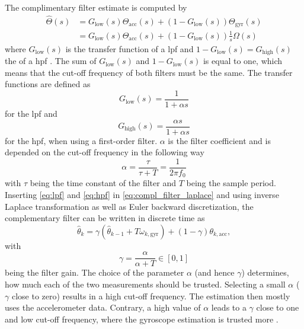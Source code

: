 The complimentary filter estimate is computed by
\begin{align}
	\label{eq:compl_filter_laplace}
	\hat{\Theta}(s) & = G_\mathrm{low}(s)\Theta_\mathrm{acc}(s) + (1 - G_\mathrm{low}(s))\Theta_\mathrm{gyr}(s) \nonumber \\
	                & = G_\mathrm{low}(s)\Theta_\mathrm{acc}(s) + (1 - G_\mathrm{low}(s))\frac{1}{s}\Omega (s)
\end{align}
where $G_\mathrm{low}(s)$ is the transfer function of a \gls{lpf} and $1-G_\mathrm{low}(s) = G_\mathrm{high}(s)$ the of a \gls{hpf} \cite{Kok2017}.
The sum of $G_\mathrm{low}(s)$ and $1-G_\mathrm{low}(s)$ is equal to one, which means that the cut-off frequency of both filters must be the same.
The transfer functions are defined as
\begin{equation}
	\label{eq:lpf}
	G_\mathrm{low} (s) = \frac{1}{1 + \alpha s}
\end{equation}
for the \gls{lpf} and
\begin{equation}
	\label{eq:hpf}
	G_\mathrm{high} (s) = \frac{\alpha s}{1 + \alpha s}
\end{equation}
for the \gls{hpf}, when using a first-order filter.
$\alpha$ is the filter coefficient and is depended on the cut-off frequency in the following way
\begin{equation}
	\alpha
	= \frac{\tau}{\tau + T}
	= \frac{1}{2\pi f_0}
	\label{eq:filter_f0}
\end{equation}
with $\tau$ being the time constant of the filter and $T$ being the sample period.
Inserting \cref{eq:lpf} and \cref{eq:hpf} in \cref{eq:compl_filter_laplace} and using inverse Laplace transformation as well as Euler backward discretization, the complementary filter can be written in discrete time as
\begin{equation}
	\hat{\theta}_k = \gamma\left(\hat{\theta}_{k - 1} + T \omega_{k, \mathrm{gyr}}\right) + (1 - \gamma) \theta_{k, \mathrm{acc}},
\end{equation}
with
\begin{equation}
	\label{eq:filter_gain}
	\gamma = \frac{\alpha}{\alpha + T} \in [0,1]
\end{equation}
being the filter gain.
The choice of the parameter $\alpha$ (and hence $\gamma$) determines, how much each of the two measurements should be trusted.
Selecting a small $\alpha$ ($\gamma$ close to zero) results in a high cut-off frequency.
The estimation then mostly uses the accelerometer data.
Contrary, a high value of $\alpha$ leads to a $\gamma$ close to one and low cut-off frequency, where the gyroscope estimation is trusted more \cite{1997Baerveldt}.\par
